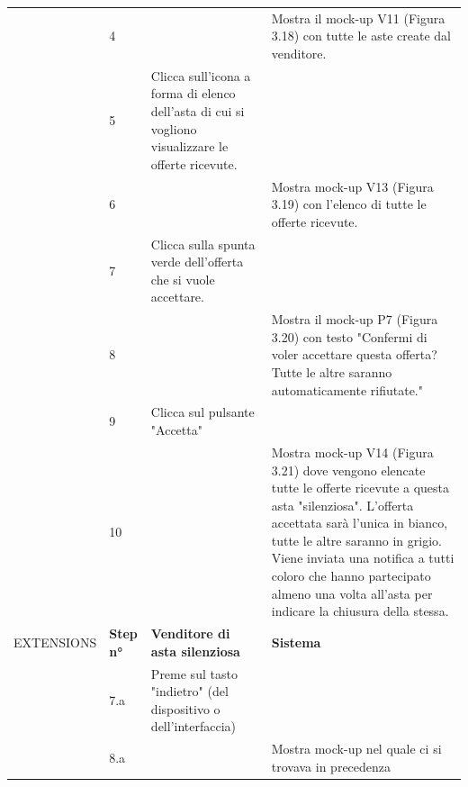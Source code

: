 \begin{longtable}{|C{3.0cm}|C{1.3cm}|L{5.2cm}|L{5.2cm}|}
                        & 4
                        & 
                        & Mostra il mock-up V11 (Figura 3.18) con tutte le aste create dal venditore.\\
                        & 5
                        & Clicca sull'icona a forma di elenco dell'asta di cui si vogliono visualizzare le offerte ricevute.
                        & \\
                        & 6
                        & 
                        & Mostra mock-up V13 (Figura 3.19) con l'elenco di tutte le offerte ricevute.\\
                        & 7
                        & Clicca sulla spunta verde dell'offerta che si vuole accettare.
                        & \\
                        & 8
                        & 
                        & Mostra il mock-up P7 (Figura 3.20) con testo "Confermi di voler accettare questa offerta? Tutte le altre saranno automaticamente rifiutate."\\
                        & 9
                        & Clicca sul pulsante "Accetta"
                        & \\
                        & 10
                        & 
                        & Mostra mock-up V14 (Figura 3.21) dove vengono elencate tutte le offerte ricevute a questa asta "silenziosa". L'offerta accettata sarà l'unica in bianco, tutte le altre saranno in grigio. Viene inviata una notifica a tutti coloro che hanno partecipato almeno una volta all'asta per indicare la chiusura della stessa.\\
                \hline
                    EXTENSIONS
                    & \textbf{Step n°} 
                    & \textbf{Venditore di asta silenziosa} 
                    & \textbf{Sistema}\\
                \hline
                        & 7.a
                        & Preme sul tasto "indietro" (del dispositivo o dell'interfaccia)
                        & \\
                        & 8.a
                        & 
                        & Mostra mock-up nel quale ci si trovava in precedenza\\

\end{longtable}
